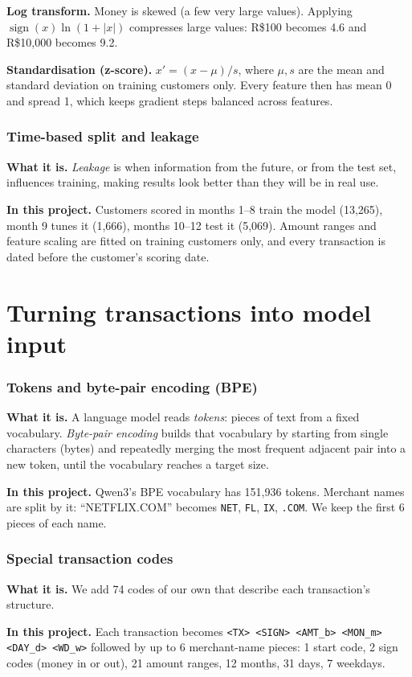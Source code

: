 \documentclass[10pt,a4paper]{article}
\newcommand{\what}[1]{\par\textbf{What it is.} #1}
\newcommand{\here}[1]{\par\textbf{In this project.} #1}
\begin{document}
\textbf{Log transform.} Money is skewed (a few very large values). Applying $\operatorname{sign}(x)\ln(1+|x|)$ compresses large values: R\$100 becomes 4.6 and R\$10,000 becomes 9.2.

\textbf{Standardisation (z-score).} $x'=(x-\mu)/s$, where $\mu,s$ are the mean and standard deviation on training customers only. Every feature then has mean 0 and spread 1, which keeps gradient steps balanced across features.

\section{Time-based split and leakage}
\what{\emph{Leakage} is when information from the future, or from the test set, influences training, making results look better than they will be in real use.}
\here{Customers scored in months 1--8 train the model (13,265), month 9 tunes it (1,666), months 10--12 test it (5,069). Amount ranges and feature scaling are fitted on training customers only, and every transaction is dated before the customer's scoring date.}

\part{Turning transactions into model input}
\section{Tokens and byte-pair encoding (BPE)}
\what{A language model reads \emph{tokens}: pieces of text from a fixed vocabulary. \emph{Byte-pair encoding} builds that vocabulary by starting from single characters (bytes) and repeatedly merging the most frequent adjacent pair into a new token, until the vocabulary reaches a target size.}
\here{Qwen3's BPE vocabulary has 151,936 tokens. Merchant names are split by it: ``NETFLIX.COM'' becomes \texttt{NET}, \texttt{FL}, \texttt{IX}, \texttt{.COM}. We keep the first 6 pieces of each name.}

\section{Special transaction codes}
\what{We add 74 codes of our own that describe each transaction's structure.}
\here{Each transaction becomes
\texttt{<TX> <SIGN> <AMT\_b> <MON\_m> <DAY\_d> <WD\_w>} followed by up to 6 merchant-name pieces:
1 start code, 2 sign codes (money in or out), 21 amount ranges, 12 months, 31 days, 7 weekdays.}
\end{document}
